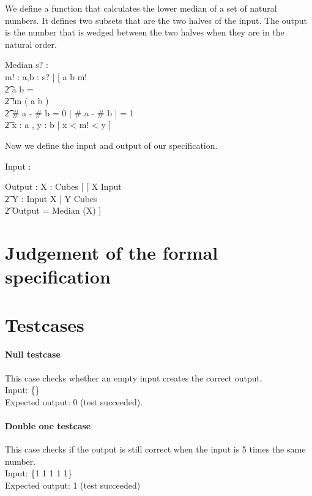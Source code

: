 \documentclass[12pt]{article}
\begin{document}
We define a function that calculates the lower median of a set of natural numbers. It defines two subsets that are the two halves of the input. The output is the number that is wedged between the two halves when they are in the natural order.
\begin{schema}{Median}
s? : \power \nat \\
m! : \nat
\where
\exists a,b : \power s? | [ \: a \union b \union m! \\
                          \t2 a \cap b = \empty \\
                          \t2 !m \notin ( a \union b ) \\
                          \t2 \# a - \# b = 0 \: \vee | \# a - \# b | = 1 \\
                          \t2 \forall x : a , y : b | x < m! < y \: ]
\end{schema}

Now we define the input and output of our specification.
\begin{axdef}
Input : \seq \nat
\end{axdef}

\begin{axdef}
Output : \nat
\where
\exists X : Cubes | [ \: X \subseteq \ran Input \\ \t2 \forall Y : \ran Input \setminus X | Y \not\subseteq Cubes \\ \t2 Output = Median (X) \: ]
\end{axdef}

\section{Judgement of the formal specification}

\section{Testcases}

\paragraph{Null testcase}
This case checks whether an empty input creates the correct output. \\
Input: \{\} \\
Expected output: 0 (test succeeded).

\paragraph{Double one testcase}
This case checks if the output is still correct when the input is 5 times the same number. \\
Input: \{1 1 1 1 1\} \\
Expected output: 1 (test succeeded)
\end{document}

